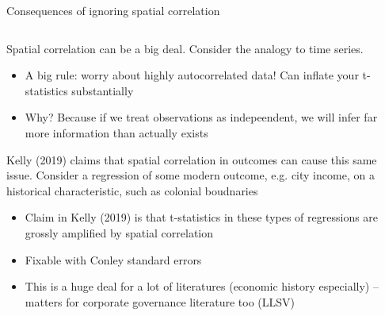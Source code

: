 \documentclass[notes,11pt, aspectratio=169]{beamer}
\newenvironment{wideitemize}{\itemize\addtolength{\itemsep}{10pt}}{\enditemize}
\begin{document}
\begin{frame}{Consequences of ignoring spatial correlation}
\begin{columns}[T] %
\begin{column}{.8\textwidth}
  \begin{wideitemize}
  \item Spatial correlation can be a big deal. Consider the analogy to time series.
    \begin{itemize}
    \item A big rule: worry about highly autocorrelated data! Can inflate your t-statistics substantially
    \item Why? Because if we treat observations as indepeendent, we
      will infer far more information than actually exists
    \end{itemize}
  \item Kelly (2019) claims that spatial correlation in outcomes can
    cause this same issue. Consider a regression of some modern
    outcome, e.g. city income, on a historical characteristic, such as
    colonial boudnaries
    \begin{itemize}
    \item Claim in Kelly (2019) is that t-statistics in these types of regressions are grossly amplified by spatial correlation
    \item Fixable with Conley standard errors
    \item This is a huge deal for a lot of literatures (economic
      history especially) -- matters for corporate governance
      literature too (LLSV)
    \end{itemize}
  \end{wideitemize}
  \end{column}
  \hfill%
  \begin{column}{.3\textwidth}
  \end{column}
  \end{columns}
\end{frame}
\end{document}
